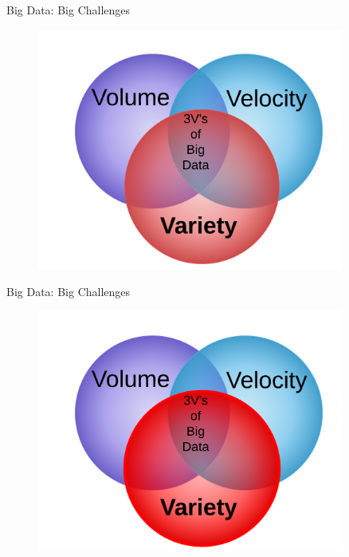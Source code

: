 \documentclass[first=dgreen,second=purple,logo=redexc]{aaltoslides}
\begin{document}
% 
% 
 \begin{frame} {Big Data: Big Challenges} 
 \begin{figure}
\centering
  \includegraphics[trim=0cm 0cm 0cm 1.5cm, clip=true, width=0.9\textwidth]{figures/venn}
\end{figure}

 \end{frame}
 
 
\begin{frame} {Big Data: Big Challenges} 
 \begin{figure}
\centering
  \includegraphics[trim=0cm 0cm 0cm 1.5cm, clip=true, width=0.9\textwidth]{figures/venn1}
\end{figure}

 \end{frame}
 
\end{document}
